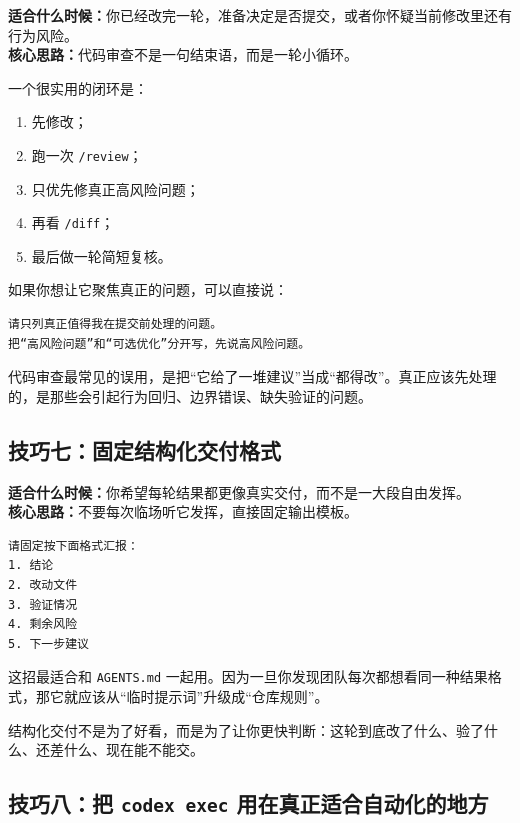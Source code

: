 \documentclass[UTF8,a4paper,12pt]{ctexart}
\begin{document}
\textbf{适合什么时候：}你已经改完一轮，准备决定是否提交，或者你怀疑当前修改里还有行为风险。\\
\textbf{核心思路：}代码审查不是一句结束语，而是一轮小循环。

一个很实用的闭环是：
\begin{enumerate}
  \item 先修改；
  \item 跑一次 \texttt{/review}；
  \item 只优先修真正高风险问题；
  \item 再看 \texttt{/diff}；
  \item 最后做一轮简短复核。
\end{enumerate}

如果你想让它聚焦真正的问题，可以直接说：

\begin{lstlisting}[style=prompt]
请只列真正值得我在提交前处理的问题。
把“高风险问题”和“可选优化”分开写，先说高风险问题。
\end{lstlisting}

\begin{warnbox}
代码审查最常见的误用，是把“它给了一堆建议”当成“都得改”。真正应该先处理的，是那些会引起行为回归、边界错误、缺失验证的问题。
\end{warnbox}

\subsection{技巧七：固定结构化交付格式}

\textbf{适合什么时候：}你希望每轮结果都更像真实交付，而不是一大段自由发挥。\\
\textbf{核心思路：}不要每次临场听它发挥，直接固定输出模板。

\begin{lstlisting}[style=prompt]
请固定按下面格式汇报：
1. 结论
2. 改动文件
3. 验证情况
4. 剩余风险
5. 下一步建议
\end{lstlisting}

这招最适合和 \texttt{AGENTS.md} 一起用。因为一旦你发现团队每次都想看同一种结果格式，那它就应该从“临时提示词”升级成“仓库规则”。

\begin{tipbox}
结构化交付不是为了好看，而是为了让你更快判断：这轮到底改了什么、验了什么、还差什么、现在能不能交。
\end{tipbox}

\subsection{技巧八：把 \texttt{codex exec} 用在真正适合自动化的地方}
\end{document}
